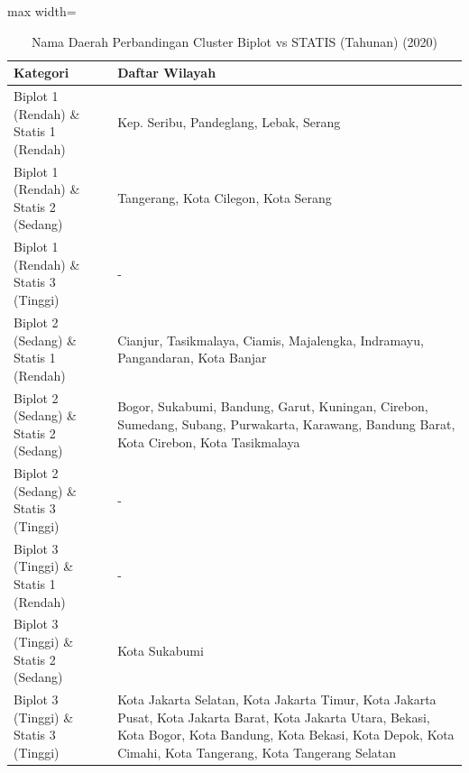 \begin{table}[H]
\centering
\caption{Nama Daerah Perbandingan Cluster Biplot vs STATIS (Tahunan) (2020)} \makeatletter{}\makeatother
\begin{adjustbox}{max width=\textwidth}
\begin{tabular}{|p{4cm}|p{10cm}|}
\hline
\textbf{Kategori} & \textbf{Daftar Wilayah} \\
\hline
Biplot 1 (Rendah) \& Statis 1 (Rendah) & Kep. Seribu, Pandeglang, Lebak, Serang \\
\hline
Biplot 1 (Rendah) \& Statis 2 (Sedang) & Tangerang, Kota Cilegon, Kota Serang \\
\hline
Biplot 1 (Rendah) \& Statis 3 (Tinggi) & - \\
\hline
Biplot 2 (Sedang) \& Statis 1 (Rendah) & Cianjur, Tasikmalaya, Ciamis, Majalengka, Indramayu, Pangandaran, Kota Banjar \\
\hline
Biplot 2 (Sedang) \& Statis 2 (Sedang) & Bogor, Sukabumi, Bandung, Garut, Kuningan, Cirebon, Sumedang, Subang, Purwakarta, Karawang, Bandung Barat, Kota Cirebon, Kota Tasikmalaya \\
\hline
Biplot 2 (Sedang) \& Statis 3 (Tinggi) & - \\
\hline
Biplot 3 (Tinggi) \& Statis 1 (Rendah) & - \\
\hline
Biplot 3 (Tinggi) \& Statis 2 (Sedang) & Kota Sukabumi \\
\hline
Biplot 3 (Tinggi) \& Statis 3 (Tinggi) & Kota Jakarta Selatan, Kota Jakarta Timur, Kota Jakarta Pusat, Kota Jakarta Barat, Kota Jakarta Utara, Bekasi, Kota Bogor, Kota Bandung, Kota Bekasi, Kota Depok, Kota Cimahi, Kota Tangerang, Kota Tangerang Selatan \\
\hline
\end{tabular}
\end{adjustbox}
\end{table}